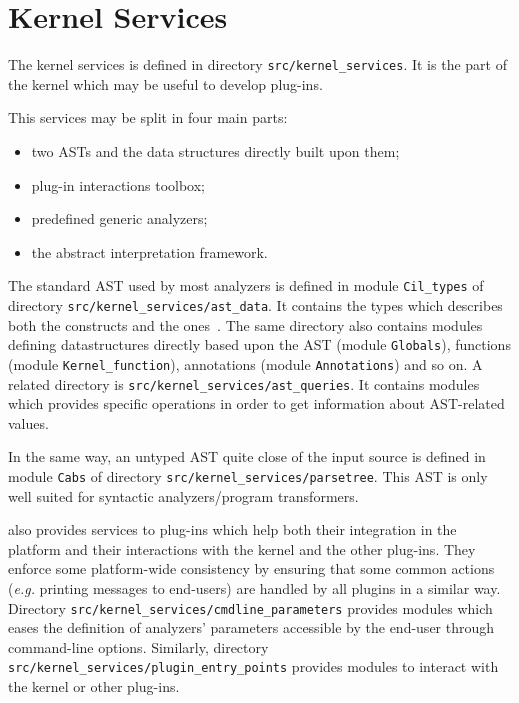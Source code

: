 \section{Kernel Services}\label{archi:services}

The kernel services is defined in directory \texttt{src/kernel\_services}. It
is the part of the \framac kernel which may be useful to develop plug-ins.

This services may be split in four main parts:
\begin{itemize}
\item two ASTs and the data structures directly built upon them;
\item plug-in interactions toolbox;
\item predefined generic analyzers;
\item the abstract interpretation framework.
\end{itemize}

The standard AST used by most analyzers is defined in module
\texttt{Cil\_types} of directory
\texttt{src/kernel\_services/ast\_data}. It contains the types which describes
both the \C constructs and the \acsl ones~\cite{acsl}. The same directory also
contains modules defining datastructures directly based upon the AST (module
\texttt{Globals}), functions (module
\texttt{Kernel\_function}), annotations (module
\texttt{Annotations}) and so on. A related directory is
\texttt{src/kernel\_services/ast\_queries}. It contains modules which provides
specific operations in order to get information about AST-related values.

In the same way, an untyped AST quite close of the \C input source is defined in
module \texttt{Cabs} of directory
\texttt{src/kernel\_services/parsetree}. This AST is only well suited
for syntactic analyzers/program transformers.

\framac also provides services to plug-ins which help both their integration in
the platform and their interactions with the kernel and the other plug-ins. They
enforce some platform-wide consistency by ensuring that some common actions
(\emph{e.g.} printing messages to end-users) are handled by all plugins in a
similar way. Directory \texttt{src/kernel\_services/cmdline\_parameters}
provides modules which eases the definition of analyzers' parameters accessible
by the end-user through command-line options. Similarly, directory
\texttt{src/kernel\_services/plugin\_entry\_points} provides modules to interact
with the \framac kernel or other plug-ins.

